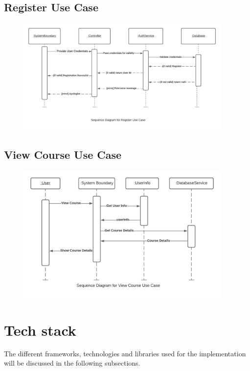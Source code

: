 \documentclass{article}
\begin{document}
\subsection{Register Use Case}
\begin{figure}[H]
    \centering
    \includegraphics[width=0.95\textwidth]{register sequence diagram.jpeg}
    \caption{}
    \label{fig:register}
\end{figure}
\subsection{View Course Use Case}
\begin{figure}[H]
    \centering
    \includegraphics[width=0.95\textwidth]{ViewCourse.jpeg}
    \caption{}
    \label{fig:ViewCourse}
\end{figure}

\section{Tech stack}
The different frameworks, technologies and libraries used for the implementation will be discussed in the following subsections.
\end{document}
